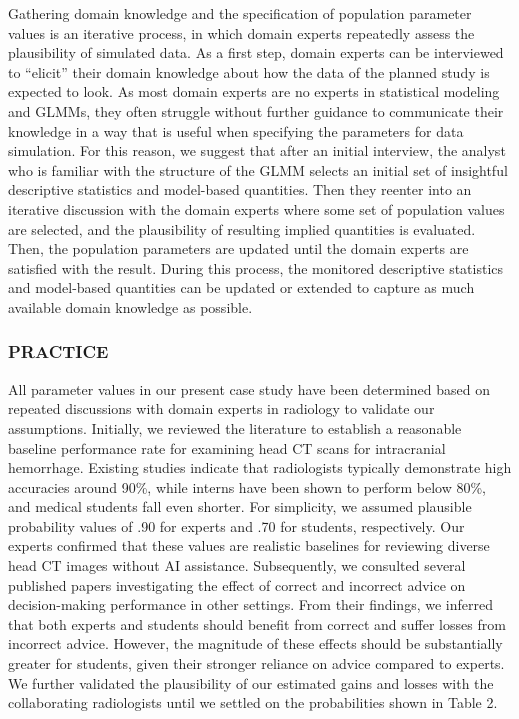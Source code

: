 \documentclass[
  man,
  floatsintext,
  longtable,
  a4paper,
  nolmodern,
  notxfonts,
  notimes,
  colorlinks=true,linkcolor=blue,citecolor=blue,urlcolor=blue]{apa7}
\begin{document}
Gathering domain knowledge and the specification of population parameter
values is an iterative process, in which domain experts repeatedly
assess the plausibility of simulated data. As a first step, domain
experts can be interviewed to ``elicit'' their domain knowledge about
how the data of the planned study is expected to look. As most domain
experts are no experts in statistical modeling and GLMMs, they often
struggle without further guidance to communicate their knowledge in a
way that is useful when specifying the parameters for data simulation.
For this reason, we suggest that after an initial interview, the analyst
who is familiar with the structure of the GLMM selects an initial set of
insightful descriptive statistics and model-based quantities. Then they
reenter into an iterative discussion with the domain experts where some
set of population values are selected, and the plausibility of resulting
implied quantities is evaluated. Then, the population parameters are
updated until the domain experts are satisfied with the result. During
this process, the monitored descriptive statistics and model-based
quantities can be updated or extended to capture as much available
domain knowledge as possible.

\subsubsection{PRACTICE}\label{practice-5}

All parameter values in our present case study have been determined
based on repeated discussions with domain experts in radiology to
validate our assumptions. Initially, we reviewed the literature to
establish a reasonable baseline performance rate for examining head CT
scans for intracranial hemorrhage. Existing studies indicate that
radiologists typically demonstrate high accuracies around 90\%, while
interns have been shown to perform below 80\%, and medical students fall
even shorter. For simplicity, we assumed plausible probability values of
.90 for experts and .70 for students, respectively. Our experts
confirmed that these values are realistic baselines for reviewing
diverse head CT images without AI assistance. Subsequently, we consulted
several published papers investigating the effect of correct and
incorrect advice on decision-making performance in other settings. From
their findings, we inferred that both experts and students should
benefit from correct and suffer losses from incorrect advice. However,
the magnitude of these effects should be substantially greater for
students, given their stronger reliance on advice compared to experts.
We further validated the plausibility of our estimated gains and losses
with the collaborating radiologists until we settled on the
probabilities shown in Table 2.
\end{document}
